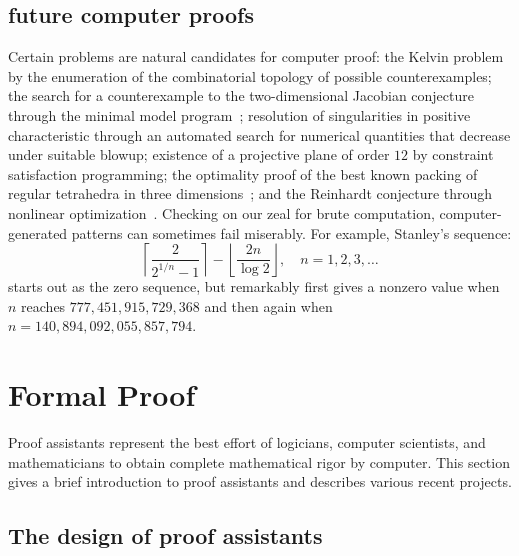 \documentclass{llncs}
\begin{document}
\subsection{future computer proofs}

Certain problems are natural candidates for computer proof: the Kelvin
problem by the enumeration of the combinatorial topology of possible
counterexamples; the search for a counterexample to the
two-dimensional Jacobian conjecture through the minimal model
program~\cite{Borisov}; resolution of singularities in positive
characteristic through an automated search for numerical quantities
that decrease under suitable blowup; existence of a projective plane
of order $12$ by constraint satisfaction programming; the optimality
proof of the best known packing of regular tetrahedra in three
dimensions~\cite{Chen-2010}; and the Reinhardt conjecture through
nonlinear optimization~\cite{HR11}.  Checking on our zeal for brute
computation, computer-generated patterns can sometimes fail miserably.
For example, Stanley's sequence:
\[
\left\lceil{\frac{2}{2^{1/n} - 1}}\right\rceil- 
\left\lfloor{\frac{2 n}{\log 2}}\right\rfloor,\quad n=1,2,3,\ldots
\]
starts out as the zero sequence, but remarkably first gives a nonzero
value when $n$ reaches $777,451,915,729,368$ and then again when
$n=140,894,092,055,857,794$.






\section{Formal Proof}

Proof assistants represent the best effort of logicians, computer
scientists, and mathematicians to obtain complete mathematical rigor
by computer.  This section gives a brief introduction to proof
assistants and describes various recent projects.


\subsection{The design of proof assistants}
\end{document}

